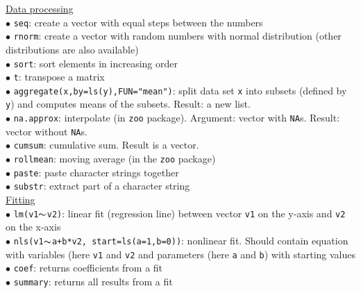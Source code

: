 \documentclass[a4paper,11pt,twocolumn,tablecaptionabove]{scrartcl}
\begin{document}
\noindent \underline{Data processing}\\
$\bullet$ \texttt{seq}: create a vector with equal steps between the numbers\\
$\bullet$ \texttt{rnorm}: create a vector with random numbers with normal distribution (other distributions are also available)\\
$\bullet$ \texttt{sort}: sort elements in increasing order\\
$\bullet$ \texttt{t}: transpose a matrix\\
$\bullet$ \texttt{aggregate(x,by=ls(y),FUN="mean")}: split data set \texttt{x} into subsets (defined by \texttt{y}) and computes means of the subsets. Result: a new list.\\
$\bullet$ \texttt{na.approx}: interpolate (in \texttt{zoo} package). Argument: vector with \texttt{NA}s. Result: vector without \texttt{NA}s.\\
$\bullet$ \texttt{cumsum}: cumulative sum. Result is a vector.\\
$\bullet$ \texttt{rollmean}: moving average (in the \texttt{zoo} package)\\
$\bullet$ \texttt{paste}: paste character strings together\\
$\bullet$ \texttt{substr}: extract part of a character string\\

\noindent \underline{Fitting}\\
$\bullet$ \texttt{lm(v1}$\thicksim$\texttt{v2)}: linear fit (regression line) between vector \texttt{v1} on the y-axis and \texttt{v2} on the x-axis\\
$\bullet$ \texttt{nls(v1}$\thicksim$\texttt{a+b*v2, start=ls(a=1,b=0))}: nonlinear fit. Should contain equation with variables (here \texttt{v1} and \texttt{v2} and parameters (here \texttt{a} and \texttt{b}) with starting values\\
$\bullet$ \texttt{coef}: returns coefficients from a fit\\
$\bullet$ \texttt{summary}: returns all results from a fit\\
\end{document}
